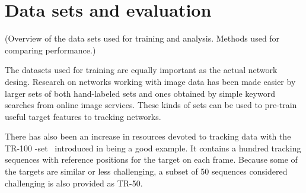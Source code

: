 \section{Data sets and evaluation}
(Overview of the data sets used for training and analysis. Methods used for comparing
performance.)

The datasets used for training are equally important as the actual network desing. %
Research on networks working with image data has been made easier by larger sets of both
hand-labeled sets and ones obtained by simple keyword searches from online image services.
These kinds of sets can be used to pre-train useful target features to tracking networks.

There has also been an increase in resources devoted to tracking data with the
TR-100 -set~\cite{VTB} introduced in being a good example. It contains a hundred tracking
sequences with reference positions for the target on each frame. Because some of the
targets are similar or less challenging, a subset of 50 sequences considered challenging
is also provided as TR-50.~\cite{OT_BENCH}
